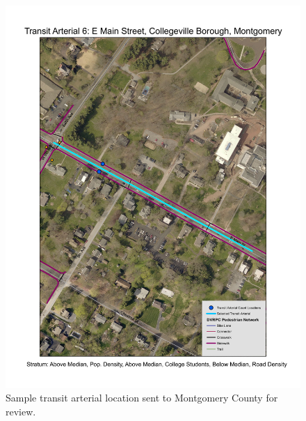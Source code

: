 \documentclass[paper=letterpaper, fontsize=11pt]{scrartcl}
\begin{document}
\FloatBarrier
\begin{figure}[!htbp]
	\centering
	\includegraphics[width=\textwidth]{county-corresp-2.jpg}
	\caption{Sample transit arterial location sent to Montgomery County for review.}
	\label{corresp-2}
\end{figure}
\FloatBarrier
\end{document}

